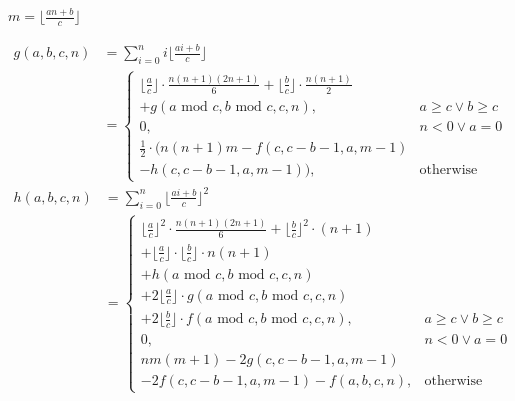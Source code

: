 $m = \lfloor\frac{an + b}{c}\rfloor$

$$ \begin{aligned}
  g(a, b, c, n) &= \sum_{i = 0}^{n}i\lfloor\frac{ai + b}{c}\rfloor \\
  &= \begin{cases}
    \lfloor{\frac{a}{c}}\rfloor \cdot \frac{n(n + 1)(2n + 1)}{6} + \lfloor\frac{b}{c}\rfloor \cdot \frac{n(n + 1)}{2} \\ + g(a\text{ mod } c, b\text{ mod } c, c, n), & a \geq c \lor b \geq c \\
    0, & n < 0 \lor a = 0 \\
    \frac{1}{2} \cdot (n(n + 1)m - f(c, c - b - 1, a, m - 1) \\ - h(c, c - b - 1, a, m - 1)), & \text{otherwise}
  \end{cases}
\end{aligned} $$
$$ \begin{aligned}
  h(a, b, c, n) &= \sum_{i = 0}^{n}\lfloor\frac{ai + b}{c}\rfloor^2 \\
  &= \begin{cases}
    \lfloor\frac{a}{c}\rfloor^2 \cdot \frac{n(n + 1)(2n + 1)}{6} + \lfloor\frac{b}{c}\rfloor^2 \cdot (n + 1) \\ + \lfloor\frac{a}{c}\rfloor \cdot \lfloor\frac{b}{c}\rfloor \cdot n(n + 1) \\ + h(a\text{ mod } c, b\text{ mod } c, c, n) \\ + 2\lfloor\frac{a}{c}\rfloor \cdot g(a\text{ mod } c, b\text{ mod } c, c, n) \\ + 2\lfloor\frac{b}{c}\rfloor \cdot f(a\text{ mod } c, b\text{ mod } c, c, n), & a \geq c \lor b \geq c \\
    0, & n < 0 \lor a = 0 \\
    nm(m + 1) - 2g(c, c - b - 1, a, m - 1) \\ - 2f(c, c - b - 1, a, m - 1) - f(a, b, c, n), & \text{otherwise}
  \end{cases}
\end{aligned} $$